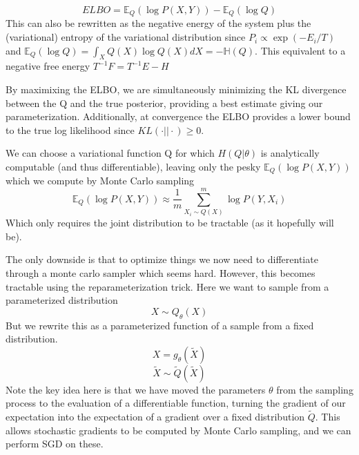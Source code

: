 \begin{equation}
ELBO = \mathbb{E}_Q(\log{P(X, Y)}) - \mathbb{E}_Q(\log{Q})
\end{equation}
This can also be rewritten as the negative energy of the system plus the (variational) entropy of the variational distribution since $P_i \propto \exp{(-E_i/T)}$ and $\mathbb{E}_Q(\log{Q}) = \int_X{Q(X) \log{Q(X)} dX} = -\mathbb{H}(Q)$. This equivalent to a negative free energy $T^{-1} F = T^{-1} E - H$

By maximixing the ELBO, we are simultaneously minimizing the KL divergence between the Q and the true posterior, providing a best estimate giving our parameterization. Additionally, at convergence the ELBO provides a lower bound to the true log likelihood since $KL(\cdot || \cdot) \geq 0$.

We can choose a variational function Q for which $H(Q | \theta)$ is analytically computable (and thus differentiable), leaving only the pesky $\mathbb{E}_Q(\log{P(X, Y)})$ which we compute by Monte Carlo sampling
\begin{equation}
 \mathbb{E}_Q(\log{P(X, Y)}) \approx \dfrac{1}{m} \sum_{X_i \sim Q(X)}^m{ \log{P(Y, X_i)} }
\end{equation}
Which only requires the joint distribution to be tractable (as it hopefully will be).

The only downside is that to optimize things we now need to differentiate through a monte carlo sampler which seems hard.
However, this becomes tractable using the reparameterization trick. Here we want to sample from a parameterized distribution
\begin{equation}
X \sim Q_\theta(X)
\end{equation}
But we rewrite this as a parameterized function of a sample from a fixed distribution.
\begin{equation}
X = g_\theta(\tilde{X})
\end{equation}
\begin{equation}
\tilde{X} \sim \tilde{Q}(\tilde{X})
\end{equation}
Note the key idea here is that we have moved the parameters $\theta$ from the sampling process to the evaluation of a differentiable function, turning the gradient of our expectation into the expectation of a gradient over a fixed distribution $\tilde{Q}$. This allows stochastic gradients to be computed by Monte Carlo sampling, and we can perform SGD on these.

